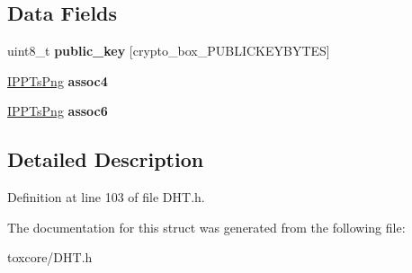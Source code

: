 \subsection*{Data Fields}
\begin{DoxyCompactItemize}
\item 
\hypertarget{struct_client__data_aaa806bb1136fb3d4b5d8d8970b596ff7}{uint8\+\_\+t {\bfseries public\+\_\+key} \mbox{[}crypto\+\_\+box\+\_\+\+P\+U\+B\+L\+I\+C\+K\+E\+Y\+B\+Y\+T\+E\+S\mbox{]}}\label{struct_client__data_aaa806bb1136fb3d4b5d8d8970b596ff7}

\item 
\hypertarget{struct_client__data_ac9843379cbcd02bdfa5c180a1474a6c5}{\hyperlink{struct_i_p_p_ts_png}{I\+P\+P\+Ts\+Png} {\bfseries assoc4}}\label{struct_client__data_ac9843379cbcd02bdfa5c180a1474a6c5}

\item 
\hypertarget{struct_client__data_a87d394929a2604f6f785fec949fac618}{\hyperlink{struct_i_p_p_ts_png}{I\+P\+P\+Ts\+Png} {\bfseries assoc6}}\label{struct_client__data_a87d394929a2604f6f785fec949fac618}

\end{DoxyCompactItemize}


\subsection{Detailed Description}


Definition at line 103 of file D\+H\+T.\+h.



The documentation for this struct was generated from the following file\+:\begin{DoxyCompactItemize}
\item 
toxcore/D\+H\+T.\+h\end{DoxyCompactItemize}
